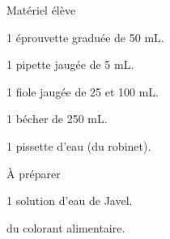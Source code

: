 
\begin{boiteMateriel}{Matériel élève}
  \effectifPremiereStss

  \begin{protocole}
    \item 1 éprouvette graduée de 50 mL.
    \item 1 pipette jaugée de 5 mL.
    \item 1 fiole jaugée de 25 et 100 mL.
    \item 1 bécher de 250 mL.
    \item 1 pissette d'eau (du robinet).
  \end{protocole}
\end{boiteMateriel}


\begin{boiteMateriel}{À préparer}
  \begin{protocole}
    \item 1 solution d'eau de Javel.
    \item du colorant alimentaire.
  \end{protocole}
\end{boiteMateriel}